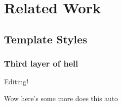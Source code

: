 \section{Related Work}

\subsection{Template Styles}

\subsubsection{Third layer of hell}

Editing! 

Wow here's some more does this auto